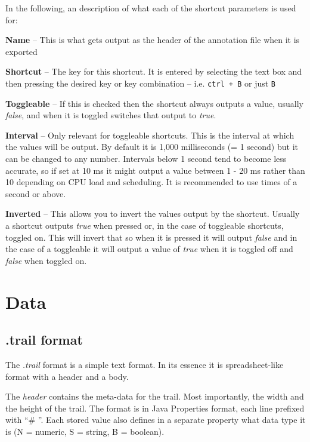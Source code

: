 \documentclass[a4paper]{book}
\begin{document}
In the following, an description of what each of the shortcut parameters is
used for:
\begin{tight_itemize}
  \item \textbf{Name} -- This is what gets output as the header of the
  annotation file when it is exported
  \item \textbf{Shortcut} -- The key for this shortcut. It is entered by
  selecting the text box and then pressing the desired key or key combination
  -- i.e. \texttt{ctrl + B} or just \texttt{B}
  \item \textbf{Toggleable} -- If this is checked then the shortcut always
  outputs a value, usually \textit{false}, and when it is toggled switches
  that output to \textit{true}.
  \item \textbf{Interval} -- Only relevant for toggleable shortcuts. This is
  the interval at which the values will be output. By default it is 1,000
  milliseconds (= 1 second) but it can be changed to any number. Intervals
  below 1 second tend to become less accurate, so if set at 10 ms it might
  output a value between 1 - 20 ms rather than 10 depending on CPU load and
  scheduling. It is recommended to use times of a second or above.
  \item \textbf{Inverted} -- This allows you to invert the values output
  by the shortcut. Usually a shortcut outputs \textit{true} when pressed or, in the
  case of toggleable shortcuts, toggled on. This will invert that so when
  it is pressed it will output \textit{false} and in the case of a toggleable it
  will output a value of \textit{true} when it is toggled off and \textit{false} when toggled on.
\end{tight_itemize}


\chapter{Data}
\section{.trail format}
The \textit{.trail} format is a simple text format. In its essence it is
spreadsheet-like format with a header and a body.

The \textit{header} contains the meta-data for the trail. Most importantly,
the width and the height of the trail. The format is in Java Properties format,
each line prefixed with ``\# ''. Each stored value also defines in a separate
property what data type it is (N = numeric, S = string, B = boolean).
\end{document}
